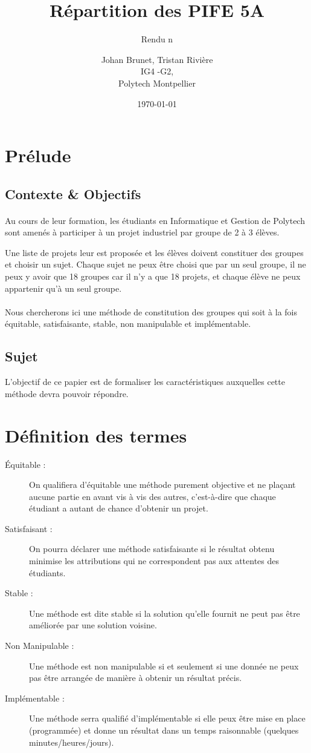 \documentclass[10pt,a4paper]{scrartcl}
\title{Répartition des PIFE 5A}
\subtitle{Rendu n\degre3}
\author{Johan Brunet, Tristan Rivière\\
   IG4 -G2,\\
   Polytech Montpellier}
\date{\today}
\begin{document}
\maketitle
\section{Prélude}
\subsection{Contexte \& Objectifs}
\paragraph*{}
Au cours de leur formation, les étudiants en Informatique et Gestion de Polytech sont amenés à participer à un projet industriel par groupe de 2 à 3 élèves.

Une liste de projets leur est proposée et les élèves doivent constituer des groupes et choisir un sujet. Chaque sujet ne peux être choisi que par un seul groupe, il ne peux y avoir que 18 groupes car il n'y a que 18 projets, et chaque élève ne peux appartenir qu'à un seul groupe.
\paragraph*{}
Nous chercherons ici une méthode de constitution des groupes qui soit à la fois équitable, satisfaisante, stable, non manipulable et implémentable.
\subsection{Sujet}
L'objectif de ce papier est de formaliser les caractéristiques auxquelles cette méthode devra pouvoir répondre.

\section{Définition des termes}
\begin{description}
\item[Équitable :]
On qualifiera d'équitable une méthode purement objective et ne plaçant aucune partie en avant vis à vis des autres, c'est-à-dire que chaque étudiant a autant de chance d'obtenir un projet.
\item[Satisfaisant :]
On pourra déclarer une méthode satisfaisante si le résultat obtenu minimise les attributions qui ne correspondent pas aux attentes des étudiants.
\item[Stable :]
Une méthode est dite stable si la solution qu'elle fournit ne peut pas être améliorée par une solution voisine.
\item[Non Manipulable :]
Une méthode est non manipulable si et seulement si une donnée ne peux pas être arrangée de manière à obtenir un résultat précis.
\item[Implémentable :]
Une méthode serra qualifié d'implémentable si elle peux être mise en place (programmée) et donne un résultat dans un temps raisonnable (quelques minutes/heures/jours).
\end{description}
\end{document}

